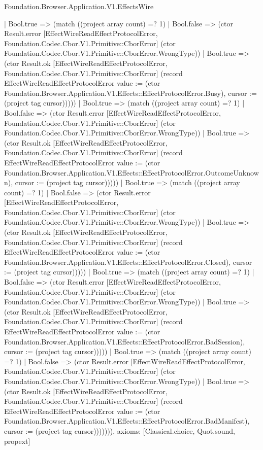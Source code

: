 \begin{lexlean}{Foundation.Browser.Application.V1.EffectsWire}
\begin{semanticmodule}
{                | Bool.true => (match ((project array count) =? 1)
                  | Bool.false => (ctor Result.error [EffectWireReadEffectProtocolError, Foundation.Codec.Cbor.V1.Primitive::CborError] (ctor Foundation.Codec.Cbor.V1.Primitive::CborError.WrongType))
                  | Bool.true => (ctor Result.ok [EffectWireReadEffectProtocolError, Foundation.Codec.Cbor.V1.Primitive::CborError] (record EffectWireReadEffectProtocolError {value := (ctor Foundation.Browser.Application.V1.Effects::EffectProtocolError.Busy), cursor := (project tag cursor)}))))
              | Bool.true => (match ((project array count) =? 1)
                | Bool.false => (ctor Result.error [EffectWireReadEffectProtocolError, Foundation.Codec.Cbor.V1.Primitive::CborError] (ctor Foundation.Codec.Cbor.V1.Primitive::CborError.WrongType))
                | Bool.true => (ctor Result.ok [EffectWireReadEffectProtocolError, Foundation.Codec.Cbor.V1.Primitive::CborError] (record EffectWireReadEffectProtocolError {value := (ctor Foundation.Browser.Application.V1.Effects::EffectProtocolError.OutcomeUnknown), cursor := (project tag cursor)}))))
            | Bool.true => (match ((project array count) =? 1)
              | Bool.false => (ctor Result.error [EffectWireReadEffectProtocolError, Foundation.Codec.Cbor.V1.Primitive::CborError] (ctor Foundation.Codec.Cbor.V1.Primitive::CborError.WrongType))
              | Bool.true => (ctor Result.ok [EffectWireReadEffectProtocolError, Foundation.Codec.Cbor.V1.Primitive::CborError] (record EffectWireReadEffectProtocolError {value := (ctor Foundation.Browser.Application.V1.Effects::EffectProtocolError.Closed), cursor := (project tag cursor)}))))
          | Bool.true => (match ((project array count) =? 1)
            | Bool.false => (ctor Result.error [EffectWireReadEffectProtocolError, Foundation.Codec.Cbor.V1.Primitive::CborError] (ctor Foundation.Codec.Cbor.V1.Primitive::CborError.WrongType))
            | Bool.true => (ctor Result.ok [EffectWireReadEffectProtocolError, Foundation.Codec.Cbor.V1.Primitive::CborError] (record EffectWireReadEffectProtocolError {value := (ctor Foundation.Browser.Application.V1.Effects::EffectProtocolError.BadSession), cursor := (project tag cursor)}))))
        | Bool.true => (match ((project array count) =? 1)
          | Bool.false => (ctor Result.error [EffectWireReadEffectProtocolError, Foundation.Codec.Cbor.V1.Primitive::CborError] (ctor Foundation.Codec.Cbor.V1.Primitive::CborError.WrongType))
          | Bool.true => (ctor Result.ok [EffectWireReadEffectProtocolError, Foundation.Codec.Cbor.V1.Primitive::CborError] (record EffectWireReadEffectProtocolError {value := (ctor Foundation.Browser.Application.V1.Effects::EffectProtocolError.BadManifest), cursor := (project tag cursor)})))))),
  axioms: [Classical.choice, Quot.sound, propext]
}


\end{semanticmodule}
\end{lexlean}

